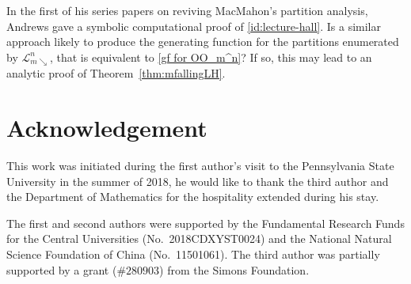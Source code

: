 \documentclass[11pt,reqno]{amsart}
\numberwithin{equation}{section}
\theoremstyle{plain}
\theoremstyle{definition}
\newcommand{\LL}{\mathcal{L}}
\begin{document}
In the first of his series papers on reviving MacMahon's partition analysis, Andrews \cite{And3} gave a symbolic computational proof of \eqref{id:lecture-hall}. Is a similar approach likely to produce the generating function for the partitions enumerated by $\LL_{m\searrow}^n$, that is equivalent to \eqref{gf for OO_m^n}? If so, this may lead to an analytic proof of Theorem~\ref{thm:mfallingLH}.



































\section*{Acknowledgement}
This work was initiated during the first author's visit to the Pennsylvania State University in the summer of 2018, he would like to thank the third author and the Department of Mathematics for the hospitality extended during his stay.

The first and second authors were supported by the Fundamental Research Funds for the Central Universities (No.~2018CDXYST0024) and the National Natural Science Foundation of China (No.~11501061). The third author was partially supported by a grant ($\#280903$) from the Simons Foundation.
\end{document}

